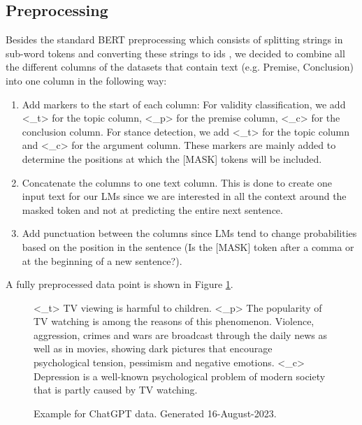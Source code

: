 \subsection{Preprocessing}

Besides the standard BERT preprocessing which consists of splitting strings in sub-word tokens and converting these strings to ids \cite{bertprepro}, we decided to combine all the different columns of the datasets that contain text (e.g. Premise, Conclusion) into one column in the following way:
\begin{enumerate}
	\item Add markers to the start of each column: For validity classification, we add <\_t> for the topic column, <\_p> for the premise column, <\_c> for the conclusion column. For stance detection, we add <\_t> for the topic column and <\_c> for the argument column. These markers are mainly added to determine the positions at which the [MASK] tokens will be included.
	\item Concatenate the columns to one text column. This is done to create one input text for our LMs since we are interested in all the context around the masked token and not at predicting the entire next sentence.
	\item Add punctuation between the columns since LMs tend to change probabilities based on the position in the sentence (Is the [MASK] token after a comma or at the beginning of a new sentence?).
\end{enumerate}

A fully preprocessed data point is shown in Figure \ref{fig:exampleprep}.

\begin{figure}[H]
	\begin{displayquote}
		<\_t> TV viewing is harmful to children. <\_p> The popularity of TV watching is among the reasons of this phenomenon. 		Violence, aggression, crimes and wars are broadcast through the daily news as well as in movies, showing dark 					pictures that encourage psychological tension, pessimism and negative emotions. <\_c> Depression is a well-known 				psychological problem of modern society that is partly caused by TV watching.
	\end{displayquote}
	\caption{Example for ChatGPT data. Generated 16-August-2023.}%
  	\label{fig:exampleprep}
\end{figure}











